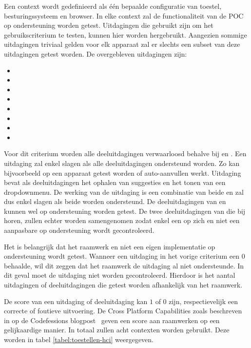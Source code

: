 Een context wordt gedefinieerd als één bepaalde configuratie van toestel, besturingssysteem en browser.
In elke context zal de functionaliteit van de POC op ondersteuning worden getest.
Uitdagingen die gebruikt zijn om het gebruikscriterium te testen, kunnen hier worden hergebruikt.
Aangezien sommige uitdagingen triviaal gelden voor elk apparaat zal er slechts een subset van deze uitdagingen getest worden.
De overgebleven uitdagingen zijn:
\begin{itemize}
 \item {}
 \item {}
 \item {}
 \item {}
 \item {}
 \item {}
 \item {}
 \item {}
\end{itemize}
Voor dit criterium worden alle deeluitdagingen verwaarloosd behalve bij  en .
Een uitdaging zal enkel slagen als alle deeluitdagingen ondersteund worden.
Zo kan bijvoorbeeld op een apparaat getest worden of auto-aanvullen werkt.
Uitdaging  bevat als deeluitdagingen het ophalen van suggesties en het tonen van een dropdownmenu.
De werking van de uitdaging is een combinatie van beide en zal dus enkel slagen als beide worden ondersteund.
De deeluitdagingen van  en  kunnen wel op ondersteuning worden getest.
De twee deeluitdagingen van  die bij  horen, zullen echter worden samengenomen zodat enkel een  op zich en niet een aanpasbare  op ondersteuning wordt gecontroleerd.


Het is belangrijk dat het raamwerk en niet een eigen implementatie op ondersteuning wordt getest.
Wanneer een uitdaging in het vorige criterium een $0$ behaalde, wil dit zeggen dat het raamwerk de uitdaging al niet ondersteunde.
In dit geval moet de uitdaging niet worden gecontroleerd.
Hierdoor is het aantal uitdagingen of deeluitdagingen die getest worden afhankelijk van het raamwerk.


De score van een uitdaging of deeluitdaging kan $1$ of $0$ zijn, respectievelijk een correcte of foutieve uitvoering.
De Cross Platform Capabilities zoals beschreven in op de Codefessions blogpost~\cite{Sarrafi2012a} geven een score aan raamwerken op een gelijkaardige manier.
In totaal zullen acht contexten worden gebruikt.
Deze worden in tabel \ref{tabel:toestellen-hci} weergegeven.

